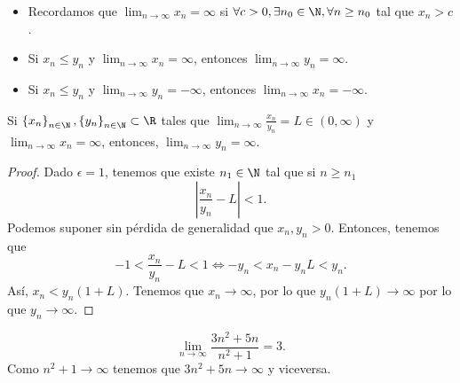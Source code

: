 \begin{observation}
\normalfont 
\begin{itemize} Si $\displaystyle \left\{ x_{n}\right\} _{n\in\N}, \left\{ y_{n}\right\} _{n\in\N}\subset\R $,
\item Recordamos que $\displaystyle \lim_{n \to \infty}x_{n} = \infty $ si $\displaystyle \forall c > 0, \exists n_{0} \in \N, \forall n\geq n_{0}$ tal que $\displaystyle x_{n} > c $. 
\item Si $\displaystyle x_{n} \leq y_{n} $ y $\displaystyle \lim_{n \to \infty}x_{n} = \infty $, entonces $\displaystyle \lim_{n \to \infty}y_{n} = \infty $. 
\item Si $\displaystyle x_{n} \leq y_{n} $ y $\displaystyle \lim_{n \to \infty} y_{n} = - \infty $, entonces $\displaystyle \lim_{n \to \infty}x_{n} = - \infty $.
\end{itemize}
\end{observation}

\begin{fcolorary}[]
	\normalfont Si $\displaystyle \left\{ x_{n}\right\} _{n\in\N}, \left\{ y_{n}\right\} _{n\in\N} \subset \R $ tales que $\displaystyle \lim_{n \to \infty}\frac{x_{n}}{y_{n}} = L \in \left(0, \infty\right) $ y $\displaystyle \lim_{n \to \infty}x_{n} = \infty  $, entonces, $\displaystyle \lim_{n \to \infty} y_{n} =\infty  $.
\end{fcolorary}

\begin{proof}
Dado $\displaystyle \epsilon = 1 $, tenemos que existe $\displaystyle n_{1} \in \N $ tal que si $\displaystyle n \geq n_{1} $ 
\[ \left|\frac{x_{n}}{y_{n}}-L\right|<1 .\]
Podemos suponer sin pérdida de generalidad que $\displaystyle x_{n}, y_{n} > 0 $. Entonces, tenemos que
\[ - 1 < \frac{x_{n}}{y_{n}} - L < 1 \iff -y_{n} < x_{n} - y_{n}L < y_{n} .\]
Así, $\displaystyle x_{n} < y_{n}\left(1 + L\right) $. Tenemos que $\displaystyle x_{n} \to \infty $, por lo que $\displaystyle y_{n}\left(1+L\right) \to \infty $ por lo que $\displaystyle y_{n} \to \infty $.
\end{proof}

\begin{eg}
\normalfont 
\[\lim_{n \to \infty}\frac{3n^{2}+5n}{n^{2}+1} = 3 .\]
Como $\displaystyle n^{2} + 1 \to \infty $ tenemos que $\displaystyle 3n^{2} + 5n \to \infty $ y viceversa. 
\end{eg}

